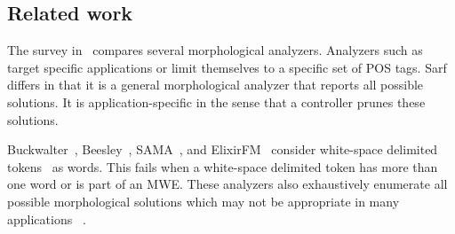 \documentclass[11pt]{article}
\begin{document}



\subsection{Related work }
\label{sec:related}

The survey in~\cite{Sughaiyer:04} compares
several morphological analyzers. 
Analyzers such as~\cite{Khoja:01,Darwish:02} 
target specific applications 
or limit themselves to a specific set of POS tags. 
Sarf differs in that it is a general morphological 
analyzer that reports all possible solutions. 
It is application-specific in the sense that a controller 
prunes these solutions. 

Buckwalter~,
Beesley~,
SAMA~\cite{Kulick:10},
and ElixirFM~\cite{Otakar:07} 
consider white-space delimited tokens~\cite{Kulick:10}
as words.
This fails when a white-space delimited token has
more than one word or is part of an MWE.
These analyzers also exhaustively enumerate all 
possible morphological solutions 
which may not be appropriate in many applications
~\cite{Maamouri:10}. 
\end{document}
